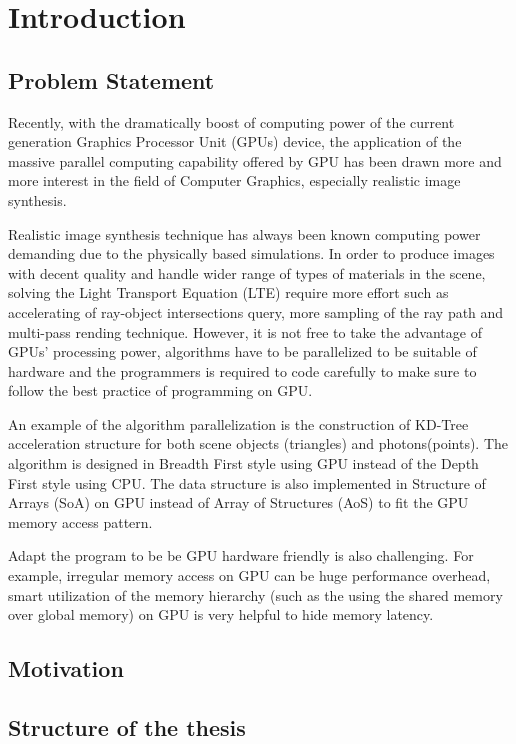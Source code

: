 \chapter{Introduction}

\section{Problem Statement}

Recently, with the dramatically boost of computing power of the current generation Graphics Processor Unit (GPUs) device, the application of the massive parallel computing capability offered by GPU has been drawn more and more interest in the field of Computer Graphics, especially realistic image synthesis.  

Realistic image synthesis technique has always been known computing power demanding due to the physically based simulations. In order to produce images with decent quality and handle wider range of types of materials in the scene, solving the Light Transport  Equation (LTE) require more effort such as accelerating of ray-object intersections query, more sampling of the ray path and multi-pass rending technique. However, it is not free to take the advantage of GPUs' processing power, algorithms have to be parallelized to be suitable of hardware and the programmers is required to code carefully to make sure to follow the best practice of programming on GPU. 

An example of the algorithm parallelization is the construction of KD-Tree acceleration structure for both scene objects (triangles) and photons(points). The algorithm is designed in Breadth First style using GPU instead of the Depth First style using CPU. The data structure is also implemented in Structure of Arrays (SoA) on GPU instead of Array of Structures (AoS) to fit the GPU memory access pattern. 

Adapt the program to be be GPU hardware friendly is also challenging. For example, irregular memory access on GPU can be huge performance overhead, smart utilization of the memory hierarchy (such as the using the shared memory over global memory) on GPU is very helpful to hide memory latency. 


\section{Motivation}


\section{Structure of the thesis}	

